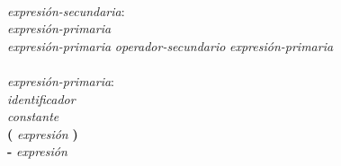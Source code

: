 \begin{tabbing}
\- \\ \textit{expresión-secundaria}: \+ \\
    \textit{expresión-primaria} \\
    \textit{expresión-primaria} \textit{operador-secundario} \textit{expresión-primaria}\\

\- \\ \textit{expresión-primaria}: \+ \\
    \textit{identificador} \\
    \textit{constante} \\
    \textbf{(} \textit{expresión} \textbf{)}\\
    \textbf{-} \textit{expresión}\\

\end{tabbing}

